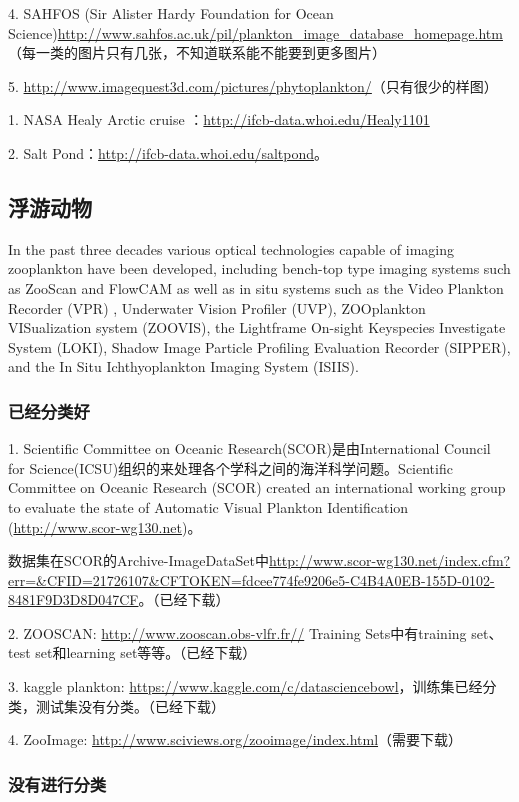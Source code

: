 4. SAHFOS (Sir Alister Hardy Foundation for Ocean Science)\url{http://www.sahfos.ac.uk/pil/plankton_image_database_homepage.htm}（每一类的图片只有几张，不知道联系能不能要到更多图片）

5. \url{http://www.imagequest3d.com/pictures/phytoplankton/}（只有很少的样图）

1. NASA Healy Arctic cruise ：\url{http://ifcb-data.whoi.edu/Healy1101}

2. Salt Pond：\url{http://ifcb-data.whoi.edu/saltpond}。




\subsection{浮游动物}
In the past three decades various optical technologies capable of imaging zooplankton have been developed, including bench-top type imaging systems such as ZooScan and FlowCAM as well as in situ systems such as the Video Plankton Recorder (VPR) , Underwater Vision Profiler (UVP), ZOOplankton VISualization system (ZOOVIS), the Lightframe On-sight Keyspecies Investigate System (LOKI), Shadow Image Particle Profiling Evaluation Recorder (SIPPER), and the In Situ Ichthyoplankton Imaging System (ISIIS).

\subsubsection{已经分类好}
1. Scientific Committee on Oceanic Research(SCOR)是由International Council for Science(ICSU)组织的来处理各个学科之间的海洋科学问题。Scientific Committee on Oceanic Research (SCOR) created an international working group to evaluate the state of Automatic Visual Plankton Identification (\url{http://www.scor-wg130.net})\cite{gorsky2010digital}。

数据集在SCOR的Archive-ImageDataSet中\url{http://www.scor-wg130.net/index.cfm?err=&CFID=21726107&CFTOKEN=fdcee774fe9206e5-C4B4A0EB-155D-0102-8481F9D3D8D047CF}。（已经下载）

2. ZOOSCAN: \url{http://www.zooscan.obs-vlfr.fr//} Training Sets中有training set、test set和learning set等等。（已经下载）


3. kaggle plankton: \url{https://www.kaggle.com/c/datasciencebowl}，训练集已经分类，测试集没有分类。（已经下载）

4. ZooImage: \url{http://www.sciviews.org/zooimage/index.html}（需要下载）

\subsubsection{没有进行分类}

